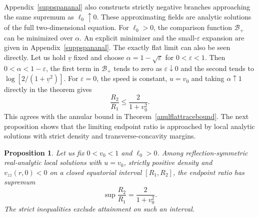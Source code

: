 \documentclass[amsmath,amsfonts,amssymb,aps,pra,superscriptaddress,10pt]{revtex4-2}
\numberwithin{equation}{section}
\theoremstyle{plain}
\newtheorem{proposition}{Proposition}
\theoremstyle{definition}
\theoremstyle{remark}
\theoremstyle{definition}
\newcommand{\ellzero}{\ell_0}
\begin{document}
Appendix~\ref{suppspananal} also constructs strictly negative branches approaching the same supremum as $\ellzero\uparrow 0$. These approximating fields are analytic solutions of the full two-dimensional equation. For $\ellzero>0$, the comparison function $\mathcal{B}_+$ can be minimized over $\alpha$. An explicit minimizer and the small-$\varepsilon$ expansion are given in Appendix~\ref{suppspananal}. The exactly flat limit can also be seen directly. Let us hold $\underline{v}$ fixed and choose $\alpha=1-\sqrt{\varepsilon}$ for $0<\varepsilon<1$. Then $0<\alpha<1-\varepsilon$, the first term in $\mathcal{B}_+$ tends to zero as $\varepsilon\downarrow 0$ and the second tends to $\log{[2/(1+\underline{v}^2)]}$. For $\varepsilon=0$, the speed is constant, $u=v_0$ and taking $\alpha\uparrow 1$ directly in the theorem gives
\begin{equation}
\frac{R_2}{R_1}\leq\frac{2}{1+v_0^2}.
\end{equation}
This agrees with the annular bound in Theorem~\ref{anulflattracebound}. The next proposition shows that the limiting endpoint ratio is approached by local analytic solutions with strict density and transverse-concavity margins.

\begin{proposition}
Let us fix $0<v_0<1$ and $\ellzero>0$. Among reflection-symmetric real-analytic local solutions with $u=v_0$, strictly positive density and $v_{zz}(r,0)<0$ on a closed equatorial interval $[R_1,R_2]$, the endpoint ratio has supremum
\begin{equation}
\sup\frac{R_2}{R_1}=\frac{2}{1+v_0^2}.
\end{equation}
The strict inequalities exclude attainment on such an interval.
\end{proposition}
\end{document}
